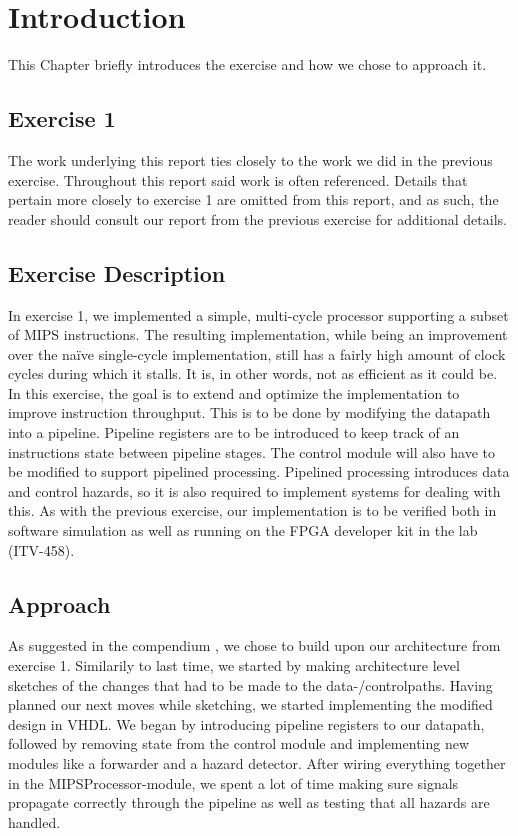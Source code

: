 \chapter{Introduction}
This Chapter briefly introduces the exercise and how we chose to approach it.

\section{Exercise 1}

The work underlying this report ties closely to the work we did in the previous exercise.
Throughout this report said work is often referenced.
Details that pertain more closely to exercise 1 are omitted from this report, and as such, the reader should consult our report from the previous exercise \cite{ex1report} for additional details.

\section{Exercise Description}

In exercise 1, we implemented a simple, multi-cycle processor supporting a subset of MIPS instructions.
The resulting implementation, while being an improvement over the naïve single-cycle implementation, still has a fairly high amount of clock cycles during which it stalls.
It is, in other words, not as efficient as it could be.
In this exercise, the goal is to extend and optimize the implementation to improve instruction throughput.
This is to be done by modifying the datapath into a pipeline.
Pipeline registers are to be introduced to keep track of an instructions state between pipeline stages.
The control module will also have to be modified to support pipelined processing.
Pipelined processing introduces data and control hazards, so it is also required to implement systems for dealing with this.
As with the previous exercise, our implementation is to be verified both in software simulation as well as running on the FPGA developer kit in the lab (ITV-458).


\section{Approach}

As suggested in the compendium \cite{compendium}, we chose to build upon our architecture from exercise 1.
Similarily to last time, we started by making architecture level sketches of the changes that had to be made to the data-/controlpaths.
Having planned our next moves while sketching, we started implementing the modified design in VHDL.
We began by introducing pipeline registers to our datapath, followed by removing state from the control module and implementing new modules like a forwarder and a hazard detector.
After wiring everything together in the MIPSProcessor-module, we spent a lot of time making sure signals propagate correctly through the pipeline as well as testing that all hazards are handled.

